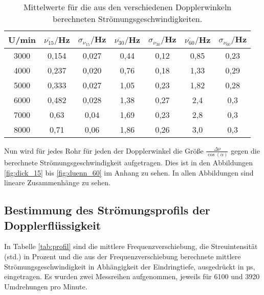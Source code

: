 \begin{table}[htp]
	\begin{center}
    \caption{Mittelwerte für die aus den verschiedenen Dopplerwinkeln berechneten
    Strömungsgeschwindigkeiten.}
    \label{tab:mittelwerte}
		\begin{tabular}{ccccccc}
		\toprule
			{U/min} & {$\overline{\nu_{15}}/$Hz} & {$\sigma_{{\nu_{15}}}/$Hz} &
      {$\overline{\nu_{30}}/$Hz} & {$\sigma_{{\nu_{30}}}/$Hz} &
      {$\overline{\nu_{60}}/$Hz} & {$\sigma_{{\nu_{60}}}/$Hz}\\
			\midrule
			3000 & 0,154 & 0,027 & 0,44 & 0,12 & 0,85 & 0,23\\
			4000 & 0,237 & 0,020 & 0,76 & 0,18 & 1,33 & 0,29\\
			5000 & 0,333 & 0,027 & 1,05 & 0,23 & 1,82 & 0,28\\
			6000 & 0,482 & 0,028 & 1,38 & 0,27 & 2,4 & 0,3\\
			7000 & 0,63  & 0,04 & 1,69 & 0,23 & 2,8 & 0,3\\
			8000 & 0,71  & 0,06 & 1,86 & 0,26 & 3,0 & 0,3\\
		\bottomrule
		\end{tabular}
	\end{center}
\end{table}

Nun wird für jedes Rohr für jeden der Dopplerwinkel die Größe $\frac{\Delta \nu}{\cos(\alpha)}$
gegen die berechnete Strömungsgeschwindigkeit aufgetragen. Dies ist in den Abbildungen
\ref{fig:dick_15} bis \ref{fig:duenn_60} im Anhang zu sehen. In allen Abbildungen sind
lineare Zusammenhänge zu sehen.

\subsection{Bestimmung des Strömungsprofils der Dopplerflüssigkeit}
\label{subsec:strömungsprofil}

In Tabelle \ref{tab:profil} sind die mittlere Frequenzverschiebung,
die Streuintensität (std.) in Prozent und die aus der Frequenzverschiebung
berechnete mittlere Strömungsgeschwindigkeit in Abhängigkeit der Eindringtiefe,
ausgedrückt in µs, eingetragen. Es wurden zwei Messreihen aufgenommen, jeweils für
6100 und 3920 Umdrehungen pro Minute.

